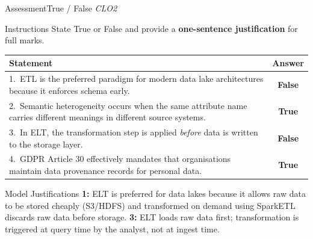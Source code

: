 \documentclass[aspectratio=169,10pt]{beamer}
\begin{document}
\begin{frame}{Assessment\textemdash True / False \hfill\small\textit{CLO2}}
  \begin{block}{Instructions}
    State True or False and provide a \textbf{one-sentence justification} for full marks.
  \end{block}
  \vspace{6pt}
  \centering
  \renewcommand{\arraystretch}{1.6}
  \begin{tabular}{p{9.2cm}c}
    \toprule
    \textbf{Statement} & \textbf{Answer} \\
    \midrule
    1.\ ETL is the preferred paradigm for modern data lake architectures because it enforces schema early. &
    \alert{\textbf{False}} \\
    2.\ Semantic heterogeneity occurs when the same attribute name carries different meanings in different source systems. &
    \textbf{True} \\
    3.\ In ELT, the transformation step is applied \emph{before} data is written to the storage layer. &
    \alert{\textbf{False}} \\
    4.\ GDPR Article 30 effectively mandates that organisations maintain data provenance records for personal data. &
    \textbf{True} \\
    \bottomrule
  \end{tabular}
  \vspace{8pt}
  \begin{exampleblock}{Model Justifications}
    \small \textbf{1:} ELT is preferred for data lakes because it allows raw data to be stored cheaply (S3/HDFS) and transformed on demand using Spark\textemdash ETL discards raw data before storage. \textbf{3:} ELT loads raw data first; transformation is triggered at query time by the analyst, not at ingest time.
  \end{exampleblock}
\end{frame}
\end{document}
